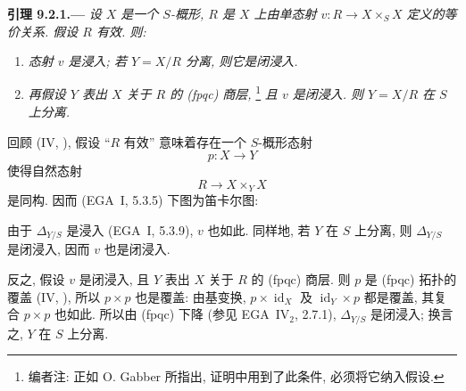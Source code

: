
\medskip
{}\label{lem:sga3-VIB-9.2.1}%
\noindent\textbf{引理 9.2.1.---}
\emph{设 \(X\) 是一个 \(S\)-概形,
\(R\) 是 \(X\) 上由单态射 \(v:R\to X\times_S X\)
定义的等价关系. 假设 \(R\) 有效. 则:}
\begin{enumerate}
\item[\textup{(i)}]\label{concl:sga3-VIB-9.2.1-i}
  \emph{态射 \(v\) 是浸入;
  若 \(Y=X/R\) 分离, 则它是闭浸入.}

\item[\textup{(ii)}]\label{concl:sga3-VIB-9.2.1-ii}
  \emph{再假设 \(Y\) 表出 \(X\) 关于 \(R\)
  的 \textup{(fpqc)} 商层,}%
  \footnote{\label{note:sga3-VIB-86}编者注: 正如 O. Gabber 所指出,
  证明中用到了此条件, 必须将它纳入假设.}
  \emph{且 \(v\) 是闭浸入. 则 \(Y=X/R\) 在 \(S\) 上分离.}
\end{enumerate}

回顾 (IV, ),
假设 ``\(R\) 有效'' 意味着存在一个 \(S\)-概形态射
\[
  p:X\longrightarrow Y
\]
使得自然态射
\[
  R\longrightarrow X\times_Y X
\]
是同构. 因而 (EGA~I, 5.3.5) 下图为笛卡尔图:
\begin{center}
  \label{diag:sga3-VIB-9.2.1-effective-square}%
\end{center}
由于 \(\Delta_{Y/S}\) 是浸入 (EGA~I, 5.3.9), \(v\) 也如此.
同样地, 若 \(Y\) 在 \(S\) 上分离,
则 \(\Delta_{Y/S}\) 是闭浸入, 因而 \(v\) 也是闭浸入.

反之, 假设 \(v\) 是闭浸入,
且 \(Y\) 表出 \(X\) 关于 \(R\) 的 \textup{(fpqc)} 商层.
则 \(p\) 是 \textup{(fpqc)} 拓扑的覆盖
(IV, ),
所以 \(p\times p\) 也是覆盖:
由基变换, \(p\times\operatorname{id}_X\)
及 \(\operatorname{id}_Y\times p\) 都是覆盖,
其复合 \(p\times p\) 也如此.
所以由 \textup{(fpqc)} 下降 (参见 EGA~IV\(_2\), 2.7.1),
\(\Delta_{Y/S}\) 是闭浸入;
换言之, \(Y\) 在 \(S\) 上分离.

